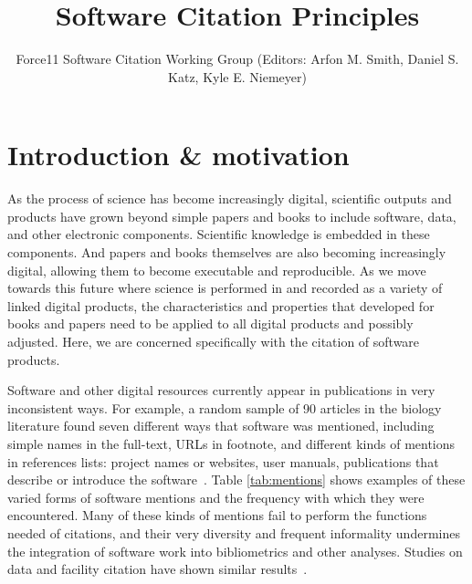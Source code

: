 \documentclass[11pt, oneside]{amsart}
\title{Software Citation Principles}
\author{Force11 Software Citation Working Group (Editors: Arfon M. Smith, Daniel S. Katz, Kyle E. Niemeyer)}
\date{}
\begin{document}
\begin{abstract}
\end{abstract}

\maketitle


\section{Introduction \& motivation}
\label{sec:intro}

As the process of science has become increasingly digital, scientific outputs and products have
grown beyond simple papers and books to include software, data, and other electronic
components.  Scientific knowledge is embedded in these components.  And papers and books
themselves are also becoming increasingly digital, allowing them to become executable
and reproducible.  As we move towards this future where science is performed in and recorded
as a variety of linked digital products, the characteristics and properties that developed for
books and papers need to be applied to all digital products and possibly adjusted.  Here, we are concerned specifically
with the citation of software products.

Software and other digital resources currently appear in publications in very inconsistent ways.
For example, a random sample of 90 articles in the biology literature found seven different ways that software was mentioned, including simple names in the full-text, URLs in footnote, and different kinds of mentions in references lists: project names or websites, user manuals, publications that describe or introduce the software~\cite{howison2015jasist}. Table \ref{tab:mentions} shows examples of these varied forms of software mentions and the frequency with which they were encountered. 
Many of these kinds of mentions fail to perform the functions needed of citations, and their very diversity and frequent informality undermines the integration of software work into bibliometrics and other analyses. 
Studies on data and facility citation have shown similar results~\cite{parsons_duerr_minster, mayernik_poster}.
\end{document}
